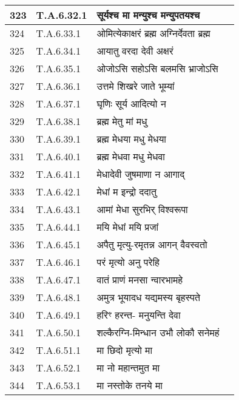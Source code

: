 \documentclass[17pt]{extarticle}
\begin{document}
\begin{longtable}{||p{0.4in}||p{0.9in}||p{4.0in}||p{0.9in}||}
        \hline
            323 & T.A.6.32.1 & सूर्यश्च मा मन्युश्च मन्युपतयश्च &      \\
        \hline
            324 & T.A.6.33.1 & ओमित्येकाक्षरं ब्रह्म अग्निर्देवता ब्रह्म &      \\
        \hline
            325 & T.A.6.34.1 & आयातु वरदा देवी अक्षरं &      \\
        \hline
            326 & T.A.6.35.1 & ओजोऽसि सहोऽसि बलमसि भ्राजोऽसि &      \\
        \hline
            327 & T.A.6.36.1 & उत्तमे शिखरे जाते भूम्यां &      \\
        \hline
            328 & T.A.6.37.1 & घृणिः सूर्य आदित्यो न &      \\
        \hline
            329 & T.A.6.38.1 & ब्रह्म मेतु मां मधु &      \\
        \hline
            330 & T.A.6.39.1 & ब्रह्म मेधया मधु मेधया &      \\
        \hline
            331 & T.A.6.40.1 & ब्रह्म मेधवा मधु मेधवा &      \\
        \hline
            332 & T.A.6.41.1 & मेधादेवी जुषमाणा न आगाद् &      \\
        \hline
            333 & T.A.6.42.1 & मेधां म इन्द्रो ददातु &      \\
        \hline
            334 & T.A.6.43.1 & आमां मेधा सुरभिर् विश्वरूपा &      \\
        \hline
            335 & T.A.6.44.1 & मयि मेधां मयि प्रजां &      \\
        \hline
            336 & T.A.6.45.1 & अपैतु मृत्यु{-}रमृतन्न आगन् वैवस्वतो &      \\
        \hline
            337 & T.A.6.46.1 & परं मृत्यो अनु परेहि &      \\
        \hline
            338 & T.A.6.47.1 & वातं प्राणं मनसा न्वारभामहे &      \\
        \hline
            339 & T.A.6.48.1 & अमुत्र भूयादध यद्यमस्य बृहस्पते &      \\
        \hline
            340 & T.A.6.49.1 & हरिꣳ हरन्त{-} मनुयन्ति देवा &      \\
        \hline
            341 & T.A.6.50.1 & शल्कैरग्नि{-}मिन्धान उभौ लोकौ सनेमहं &      \\
        \hline
            342 & T.A.6.51.1 & मा छिदो मृत्यो मा &      \\
        \hline
            343 & T.A.6.52.1 & मा नो महान्तमुत मा &      \\
        \hline
            344 & T.A.6.53.1 & मा नस्तोके तनये मा &      \\

\end{longtable}
\end{document}
